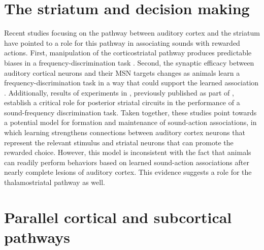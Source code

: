 \section{The striatum and decision making}
Recent studies focusing on the pathway between auditory cortex and the striatum have pointed to a role for this pathway in associating sounds with rewarded actions.
First, manipulation of the corticostriatal pathway produces predictable biases in a frequency-discrimination task \citep{Znamenskiy2013}.
Second, the synaptic efficacy between auditory cortical neurons and their MSN targets changes as animals learn a frequency-discrimination task in a way that could support the learned association \citep{Xiong2015}.
Additionally, results of experiments in \ch{\Musc}, previously published as part of \citet{Guo2018}, establish a critical role for posterior striatal circuits in the performance of a sound-frequency discrimination task. 
Taken together, these studies point towards a potential model for formation and maintenance of sound-action associations, in which learning strengthens connections between auditory cortex neurons that represent the relevant stimulus and striatal neurons that can promote the rewarded choice.
%
However, this model is inconsistent with the fact that animals can readily perform behaviors based on learned sound-action associations after nearly complete lesions of auditory cortex.
%
This evidence suggests a role for the thalamostriatal pathway as well.

\section{Parallel cortical and subcortical pathways}

